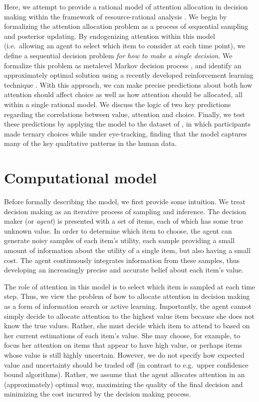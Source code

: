 \documentclass[12pt,a4paperpaper,]{article}
\begin{document}
Here, we attempt to provide a rational model of attention allocation in decision making within the framework of resource-rational analysis \citep{griffiths15}. We begin by formalizing the attention allocation problem as a process of sequential sampling and posterior updating. By endogenizing attention within this model (i.e.~allowing an agent to select which item to consider at each time point), we define a sequential decision problem \emph{for how to make a single decision}. We formalize this problem as metalevel Markov decision process \citep{Hay2012}, and identify an approximately optimal solution using a recently developed reinforcement learning technique \citep{callaway2018learning}. With this approach, we can make precise predictions about both how attention should affect choice as well as how attention should be allocated, all within a single rational model. We discuss the logic of two key predictions regarding the correlations between value, attention and choice. Finally, we test these predictions by applying the model to the dataset of \citet{Krajbich2011}, in which participants made ternary choices while under eye-tracking, finding that the model captures many of the key qualitative patterns in the human data.


\section{Computational model}

Before formally describing the model, we first provide some intuition. We treat decision making as an iterative process of sampling and inference. The decision maker (or \emph{agent}) is presented with a set of items, each of which has some true unknown value. In order to determine which item to choose, the agent can generate noisy samples of each item's utility, each sample providing a small amount of information about the utility of a single item, but also having a small cost. The agent continuously integrates information from these samples, thus developing an increasingly precise and accurate belief about each item's value.

The role of attention in this model is to select which item is sampled at each time step. Thus, we view the problem of how to allocate attention in decision making as a form of information search or active learning. Importantly, the agent cannot simply decide to allocate attention to the highest value item because she does not know the true values. Rather, she must decide which item to attend to based on her current estimations of each item's value. She may choose, for example, to focus her attention on items that appear to have high value, or perhaps items whose value is still highly uncertain. However, we do not specify how expected value and uncertainty should be traded off (in contrast to e.g.~upper confidence bound algorithms). Rather, we assume that the agent allocates attention in an (approximately) optimal way, maximizing the quality of the final decision and minimizing the cost incurred by the decision making process.
\end{document}
